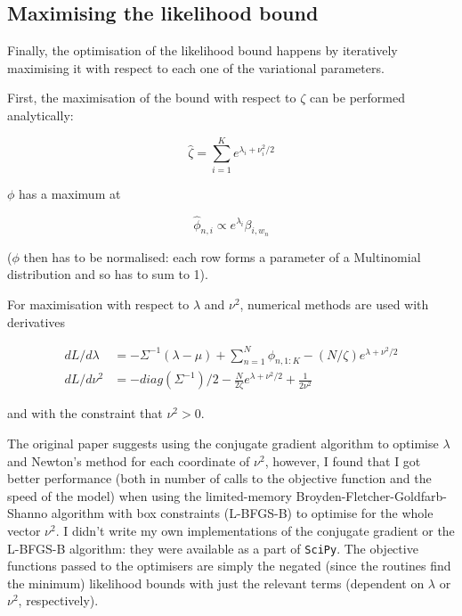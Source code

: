\documentclass[12pt,a4paper,twoside,openright]{report}
\begin{document}
\subsection{Maximising the likelihood bound}

Finally, the optimisation of the likelihood bound happens by iteratively maximising it with respect to each one of the variational parameters.

First, the maximisation of the bound with respect to $\zeta$ can be performed analytically:

\begin{equation}
\hat\zeta = \sum\limits_{i=1}^Ke^{\lambda_i + \nu_i^2 / 2}
\end{equation}

$\phi$ has a maximum at

\begin{equation}
\hat\phi_{n, i} \propto e^{\lambda_i}\beta_{i, w_n} \label{eq:phiopt}
\end{equation}

($\phi$ then has to be normalised: each row forms a parameter of a Multinomial distribution and so has to sum to 1).

For maximisation with respect to $\lambda$ and $\nu^2$, numerical methods are used with derivatives

\begin{align}
dL/d\lambda & = -\Sigma^{-1}(\lambda - \mu) + \sum\limits_{n=1}^N\phi_{n, 1:K} - (N/\zeta)e^{\lambda + \nu^2/2} \\
dL/d\nu^2 & = -\mathit{diag}(\Sigma^{-1})/2 - \frac{N}{2\zeta}e^{\lambda + \nu^2/2} + \frac{1}{2\nu^2}
\end{align}

and with the constraint that $\nu^2 > 0$.

The original paper suggests using the conjugate gradient algorithm to optimise $\lambda$ and Newton's method for each coordinate of $\nu^2$, however, I found that I got better performance (both in number of calls to the objective function and the speed of the model) when using the limited-memory Broyden-Fletcher-Goldfarb-Shanno algorithm with box constraints (L-BFGS-B)\cite{doi:10.1137/0916069} to optimise for the whole vector $\nu^2$. I didn't write my own implementations of the conjugate gradient or the L-BFGS-B algorithm: they were available as a part of \texttt{SciPy}. The objective functions passed to the optimisers are simply the negated (since the routines find the minimum) likelihood bounds with just the relevant terms (dependent on $\lambda$ or $\nu^2$, respectively).
\end{document}
